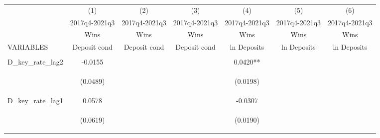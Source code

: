 \documentclass[]{article}
\begin{document}
\begin{center}
\begin{tabular}{lcccccc} \hline
 & (1) & (2) & (3) & (4) & (5) & (6) \\
 & 2017q4-2021q3 & 2017q4-2021q3 & 2017q4-2021q3 & 2017q4-2021q3 & 2017q4-2021q3 & 2017q4-2021q3 \\
 & Wins & Wins & Wins & Wins & Wins & Wins \\
VARIABLES & Deposit cond & Deposit cond & Deposit cond & ln Deposits & ln Deposits & ln Deposits \\ \hline
\vspace{4pt} & \begin{footnotesize}\end{footnotesize} & \begin{footnotesize}\end{footnotesize} & \begin{footnotesize}\end{footnotesize} & \begin{footnotesize}\end{footnotesize} & \begin{footnotesize}\end{footnotesize} & \begin{footnotesize}\end{footnotesize} \\
D\_key\_rate\_lag2 & -0.0155 &  &  & 0.0420** &  &  \\
\vspace{4pt} & \begin{footnotesize}(0.0489)\end{footnotesize} & \begin{footnotesize}\end{footnotesize} & \begin{footnotesize}\end{footnotesize} & \begin{footnotesize}(0.0198)\end{footnotesize} & \begin{footnotesize}\end{footnotesize} & \begin{footnotesize}\end{footnotesize} \\
D\_key\_rate\_lag1 & 0.0578 &  &  & -0.0307 &  &  \\
\vspace{4pt} & \begin{footnotesize}(0.0619)\end{footnotesize} & \begin{footnotesize}\end{footnotesize} & \begin{footnotesize}\end{footnotesize} & \begin{footnotesize}(0.0190)\end{footnotesize} & \begin{footnotesize}\end{footnotesize} & \begin{footnotesize}\end{footnotesize} \\

\end{tabular}
\end{center}
\end{document}
